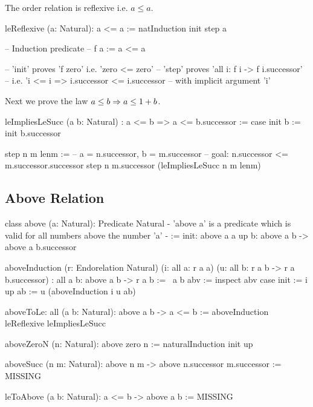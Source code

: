 \noindent The order relation is reflexive i.e. $a \le a$.

\begin{alba}
    leReflexive (a: Natural): a <= a :=
        natInduction init step a

    -- Induction predicate
    -- f a := a <= a

    -- 'init' proves 'f zero' i.e. 'zero <= zero'
    -- 'step' proves 'all i: f i -> f i.successor'
    --     i.e. 'i <= i => i.successor <= i.successor
    --     with implicit argument 'i'
\end{alba}



\noindent Next we prove the law $a \le b \Rightarrow a \le 1 + b$.

\begin{alba}
    leImpliesLeSucc
        (a b: Natural)
        :  a <= b  =>  a <= b.successor
    :=
        case
            init b :=
                init b.successor

            step n m lenm :=
                -- a = n.successor, b = m.successor
                -- goal: n.successor <= m.successor.successor
                step
                    n
                    m.successor
                    (leImpliesLeSucc n m lenm)
\end{alba}







\subsection{Above Relation}

\begin{alba}
    class
        above (a: Natural): Predicate Natural
            {- 'above a' is a predicate which is valid for all numbers
                above the number 'a' -}
    :=
        init: above a a
        up b: above a b -> above a b.successor

    aboveInduction
        (r: Endorelation Natural)
        (i: all a: r a a)
        (u: all b: r a b -> r a b.successor)
        : all a b: above a b -> r a b
    :=
        \ a b abv :=
            inspect abv case
                init := i
                up ab :=
                    u (aboveInduction i u ab)

    aboveToLe: all (a b: Natural): above a b -> a <= b :=
        aboveInduction leReflexive leImpliesLeSucc

    aboveZeroN (n: Natural): above zero n :=
        naturalInduction init up

    aboveSucc (n m: Natural): above n m -> above n.successor m.successor :=
        MISSING


    leToAbove (a b: Natural): a <= b -> above a b :=
        MISSING
\end{alba}







